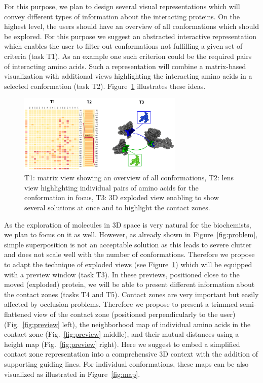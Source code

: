 \documentclass[11pt,a4paper,titlepage,oneside,onecolumn]{article}
\begin{document}
For this purpose, we plan to design several visual representations which will convey different types of information about the interacting proteins.
On the highest level, the users should have an overview of all conformations which should be explored. 
For this purpose we suggest an abstracted interactive representation which enables the user to filter out conformations not fulfilling a given set of criteria (task T1).
As an example one such criterion could be the required pairs of interacting amino acids. 
Such a representation will combine a matrix-based visualization with additional views highlighting the interacting amino acids in a selected conformation (task T2).
Figure~\ref{fig:matrix} illustrates these ideas. 

\begin{figure}[ht]
\centering
\includegraphics[width=0.7\textwidth]{pics/matrix.png}
\caption{T1: matrix view showing an overview of all conformations, T2: lens view highlighting individual pairs of amino acids for the conformation in focus, T3: 3D exploded view enabling to show several solutions at once and to highlight the contact zones.}
\label{fig:matrix}
\end{figure}

As the exploration of molecules in 3D space is very natural for the biochemists, we plan to focus on it as well.
However, as already shown in Figure~\ref{fig:problem}, simple superposition is not an acceptable solution as this leads to severe clutter and does not scale well with the number of conformations.
Therefore we propose to adapt the technique of exploded views (see Figure~\ref{fig:matrix}) which will be equipped with a preview window (task T3).
In these previews, positioned close to the moved (exploded) protein, we will be able to present different information about the contact zones (tasks T4 and T5).
Contact zones are very important but easily affected by occlusion problems. 
Therefore we propose to present a trimmed semi-flattened view of the contact zone (positioned perpendicularly to the user) (Fig.~\ref{fig:preview} left), the neighborhood map of individual amino acids in the contact zone (Fig.~\ref{fig:preview} middle), and their mutual distances using a height map (Fig.~\ref{fig:preview} right).
Here we suggest to embed a simplified contact zone representation into a comprehensive 3D context with the addition of supporting guiding lines.
For individual conformations, these maps can be also visualized as illustrated in Figure~\ref{fig:map}.
\end{document}
